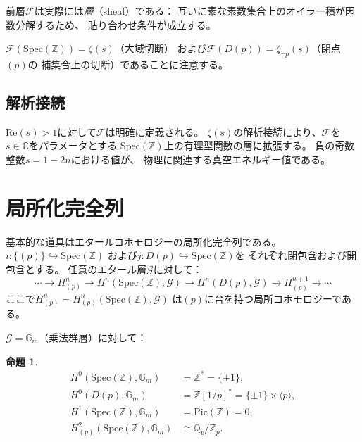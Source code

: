 \documentclass[11pt,a4paper]{article}
\newtheorem{proposition}[theorem]{命題}
\newcommand{\Spec}{\mathrm{Spec}}
\newcommand{\Zp}{\mathbb{Z}[1/p]}
\newcommand{\Qp}{\mathbb{Q}_p}
\newcommand{\Gm}{\mathbb{G}_m}
\begin{document}
前層$\mathcal{F}$は実際には\emph{層}（sheaf）である：
互いに素な素数集合上のオイラー積が因数分解するため、
貼り合わせ条件が成立する。

$\mathcal{F}(\Spec(\mathbb{Z})) = \zeta(s)$（大域切断）
および$\mathcal{F}(D(p)) = \zeta_{\neg p}(s)$（閉点$(p)$の
補集合上の切断）であることに注意する。

\subsection{解析接続}

$\mathrm{Re}(s) > 1$に対して$\mathcal{F}$は明確に定義される。
$\zeta(s)$の解析接続により、$\mathcal{F}$を
$s \in \mathbb{C}$をパラメータとする
$\Spec(\mathbb{Z})$上の有理型関数の層に拡張する。
負の奇数整数$s = 1 - 2n$における値が、
物理に関連する真空エネルギー値である。

\section{局所化完全列}
\label{sec:localization}

基本的な道具はエタールコホモロジーの局所化完全列である。
$i: \{(p)\} \hookrightarrow \Spec(\mathbb{Z})$
および$j: D(p) \hookrightarrow \Spec(\mathbb{Z})$を
それぞれ閉包含および開包含とする。
任意のエタール層$\mathcal{G}$に対して：
\begin{equation}
  \cdots \to H^n_{(p)} \to H^n(\Spec(\mathbb{Z}), \mathcal{G})
  \to H^n(D(p), \mathcal{G}) \to H^{n+1}_{(p)} \to \cdots
  \label{eq:les}
\end{equation}
ここで$H^n_{(p)} = H^n_{(p)}(\Spec(\mathbb{Z}), \mathcal{G})$
は$(p)$に台を持つ局所コホモロジーである。

$\mathcal{G} = \Gm$（乗法群層）に対して：

\begin{proposition}
\label{prop:local_cohom}
\begin{align}
  H^0(\Spec(\mathbb{Z}), \Gm) &= \mathbb{Z}^* = \{\pm 1\}, \\
  H^0(D(p), \Gm) &= \Zp^* = \{\pm 1\} \times \langle p \rangle, \\
  H^1(\Spec(\mathbb{Z}), \Gm) &= \mathrm{Pic}(\mathbb{Z}) = 0, \\
  H^2_{(p)}(\Spec(\mathbb{Z}), \Gm) &\cong \Qp/\mathbb{Z}_p.
  \label{eq:local_cohom}
\end{align}
\end{proposition}
\end{document}
